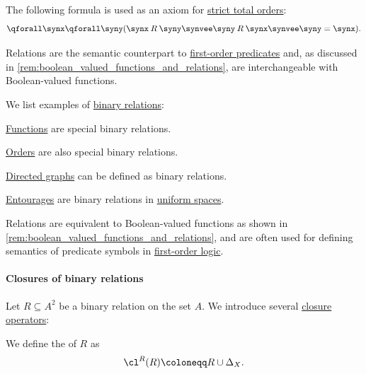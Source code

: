 \begin{comments}
\begin{definition}
\begin{thmenum}[resume=def:binary_relation]
    The following formula is used as an axiom for \hyperref[def:totally_ordered_set]{strict total orders}:
    \begin{equation}\label{eq:def:binary_relation/trichotomy}
      \qforall \synx \qforall \syny (\synx \mathbin{R} \syny \synvee \syny \mathbin{R} \synx \synvee \syny = \synx).
    \end{equation}
  \end{thmenum}
\end{definition}
\begin{comments}
  \item Relations are the semantic counterpart to \hyperref[def:fol_signature/predicate]{first-order predicates} and, as discussed in \cref{rem:boolean_valued_functions_and_relations}, are interchangeable with Boolean-valued functions.
\end{comments}

\begin{example}\label{ex:def:binary_relation}
  We list examples of \hyperref[def:binary_relation]{binary relations}:
  \begin{thmenum}
     \hyperref[def:function]{Functions} are special binary relations.

     \hyperref[ch:order_theory]{Orders} are also special binary relations.

     \hyperref[def:directed_graph]{Directed graphs} can be defined as binary relations.

     \hyperref[def:entourage]{Entourages} are binary relations in \hyperref[def:uniform_space]{uniform spaces}.

     Relations are equivalent to Boolean-valued functions as shown in \cref{rem:boolean_valued_functions_and_relations}, and are often used for defining semantics of predicate symbols in \hyperref[sec:first_order_logic]{first-order logic}.
  \end{thmenum}
\end{example}

\paragraph{Closures of binary relations}

\begin{definition}\label{def:relation_closures}
  Let \( R \subseteq A^2 \) be a binary relation on the set \( A \). We introduce several \hyperref[def:abstract_closure_operator]{closure operators}:
  \begin{thmenum}
     We define the  of \( R \) as
    \begin{equation*}
      \cl^R(R) \coloneqq R \cup \Delta_X.
    \end{equation*}


\end{thmenum}
\end{definition}
\end{comments}
